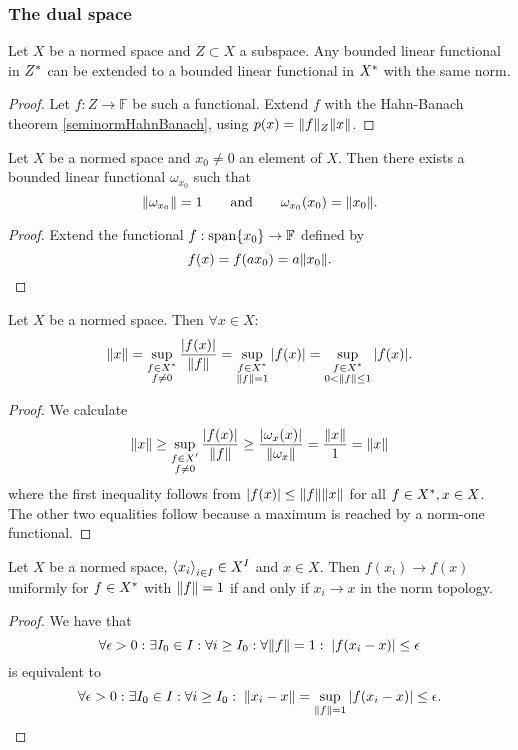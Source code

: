 \subsubsection{The dual space}
\begin{lemma}
Let $X$ be a normed space and $Z\subset X$ a subspace. Any bounded linear functional in ${Z}^*$ can be extended to a bounded linear functional in ${X}^*$ with the same norm.
\end{lemma}
\begin{proof}
Let $f:Z\to \mathbb{F}$ be such a functional. Extend $f$ with the Hahn-Banach theorem \ref{seminormHahnBanach}, using $p(x) = \lVert f\rVert_Z\lVert x\rVert$.
\end{proof}
\begin{corollary} \label{existenceBoundedFunctionalOfSameNorm}
Let $X$ be a normed space and $x_0\neq 0$ an element of $X$. Then there exists a bounded linear functional $\omega_{x_0}$ such that
\[ \lVert\omega_{x_0}\rVert = 1 \qquad \text{and} \qquad \omega_{x_0}(x_0)=\lVert x_0\rVert. \]
\end{corollary}
\begin{proof}
Extend the functional $f: \operatorname{span}\{x_0\}\to \mathbb{F}$ defined by
\[ f(x) = f(ax_0) = a\lVert x_0\rVert. \]
\end{proof}
\begin{corollary} \label{normFromContinuousFunctionals}
Let $X$ be a normed space. Then $\forall x\in X:$
\[ \lVert x\rVert = \sup_{\substack{f\in {X}^* \\ f\neq 0}}\frac{|f(x)|}{\lVert f\rVert} = \sup_{\substack{f\in {X}^* \\ \lVert f\rVert = 1}}|f(x)| = \sup_{\substack{f\in {X}^* \\ 0< \lVert f\rVert \leq 1}}|f(x)|. \]
\end{corollary}
\begin{proof}
We calculate
\[ \lVert x\rVert \geq \sup_{\substack{f\in X' \\ f\neq 0}}\frac{|f(x)|}{\lVert f\rVert} \geq \frac{|\omega_{x}(x)|}{\lVert\omega_{x}\rVert} = \frac{\lVert x\rVert}{1} = \lVert x\rVert \]
where the first inequality follows from $|f(x)|\leq \lVert f\rVert\lVert x\rVert$ for all $f\in {X}^*, x\in X$. The other two equalities follow because a maximum is reached by a norm-one functional.
\end{proof}
\begin{corollary} \label{uniformConvergenceWeakTopologyGivesNormTopology}
Let $X$ be a normed space, $\left\langle x_i \right\rangle_{i\in I} \in X^I$ and $x \in X$. Then $f(x_i) \to f(x)$ uniformly for $f\in{X}^*$ with $\lVert f\rVert = 1$ \textup{if and only if} $x_i \to x$ in the norm topology.
\end{corollary}
\begin{proof}
We have that
\[ \forall \epsilon > 0: \exists I_0\in I: \forall i\geq I_0: \forall \lVert f\rVert = 1: \; |f(x_i-x)| \leq \epsilon \]
is equivalent to
\[ \forall \epsilon > 0: \exists I_0\in I: \forall i\geq I_0: \; \lVert x_i-x\rVert = \sup_{\lVert f\rVert=1} |f(x_i-x)| \leq \epsilon. \]
\end{proof}

